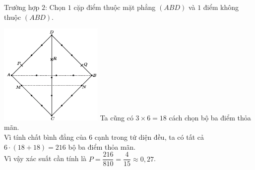\begin{ex}
{{\begin{itemize}
    \end{itemize}
    Trường hợp $2$: Chọn $1$ cặp điểm thuộc mặt phẳng $(ABD)$ và $1$ điểm không thuộc $(ABD)$.
    }
    {
        \includegraphics[width=5cm]{img/HXN-2-22-LG}
    }
    Ta cũng có $3\times 6=18$ cách chọn bộ ba điểm thỏa mãn.\\
    Vì tính chất bình đẳng của $6$ cạnh trong tứ diện đều, ta có tất cả $6\cdot (18+18)=216$ bộ ba điểm thỏa mãn.\\
    Vì vậy xác suất cần tính là $P=\dfrac{216}{810}=\dfrac{4}{15}\approx 0{,}27$.
}
\end{ex}
